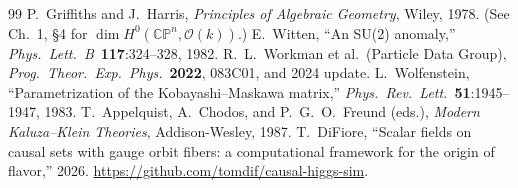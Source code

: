 \documentclass[12pt,a4paper]{article}
\begin{document}
\begin{thebibliography}{99}
 P.~Griffiths and J.~Harris, \emph{Principles of Algebraic Geometry}, Wiley, 1978. (See Ch.~1, \S4 for $\dim H^0(\mathbb{CP}^n, \mathcal{O}(k))$.)
 E.~Witten, ``An SU(2) anomaly,'' \emph{Phys.\ Lett.\ B}\ \textbf{117}:324--328, 1982.
 R.~L.~Workman et al.\ (Particle Data Group), \emph{Prog.\ Theor.\ Exp.\ Phys.}\ \textbf{2022}, 083C01, and 2024 update.
 L.~Wolfenstein, ``Parametrization of the Kobayashi--Maskawa matrix,'' \emph{Phys.\ Rev.\ Lett.}\ \textbf{51}:1945--1947, 1983.
 T.~Appelquist, A.~Chodos, and P.~G.~O.~Freund (eds.), \emph{Modern Kaluza--Klein Theories}, Addison-Wesley, 1987.
 T.~DiFiore, ``Scalar fields on causal sets with gauge orbit fibers: a computational framework for the origin of flavor,'' 2026. \url{https://github.com/tomdif/causal-higgs-sim}.
\end{thebibliography}
\end{document}
